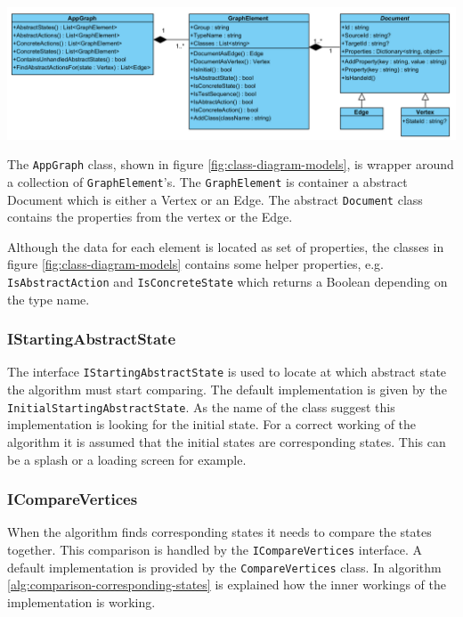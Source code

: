 \begingroup
\captionsetup{type=figure}
\includegraphics[scale=0.6]{images/4-UML-Models.png}
\label{fig:class-diagram-models}
\endgroup

The \verb|AppGraph| class, shown in figure \ref{fig:class-diagram-models}, is wrapper around a collection of \verb|GraphElement|'s. The \verb|GraphElement| is container a abstract Document which is either a Vertex or an Edge. The abstract \verb|Document| class contains the properties from the vertex or the Edge.


Although the data for each element is located as set of properties, the classes in figure \ref{fig:class-diagram-models} contains some helper properties, e.g. \verb|IsAbstractAction| and \verb|IsConcreteState| which returns a Boolean depending on the type name. 

\subsubsection{IStartingAbstractState} \label{sec:starting-abstract-state}
The interface \verb|IStartingAbstractState| is used to locate at which abstract state the algorithm must start comparing. The default implementation is given by the \verb|InitialStartingAbstractState|. As the name of the class suggest this implementation is looking for the initial state. For a correct working of the algorithm it is assumed that the initial states are corresponding states. This can be a splash or a loading screen for example.

\subsubsection{ICompareVertices} \label{sec:i-compare-vertices}
When the algorithm finds corresponding states it needs to compare the states together. This comparison is handled by the \verb|ICompareVertices| interface. A default implementation is provided by the \verb|CompareVertices| class. In algorithm \ref{alg:comparison-corresponding-states} is explained how the inner workings of the implementation is working.  

